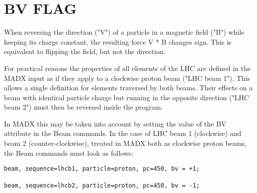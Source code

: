 
\section{BV FLAG}

When reversing the direction ("V") of a particle in a magnetic field
("B") while keeping its charge constant, the resulting force V * B
changes sign. This is equivalent to flipping the field, but not the
direction.  

For practical reasons the properties of all elements of the LHC are
defined in the MADX input as if they apply to a clockwise proton beam
("LHC beam 1"). This allows a single definition for elements traversed
by both beams. Their effects on a beam with identical particle charge
but running in the opposite direction ("LHC beam 2") must then be
reversed inside the program.  

In MADX this may be taken into account by setting the value of the BV
attribute in the Beam commands. In the case of LHC beam 1 (clockwise)
and beam 2 (counter-clockwise), treated in MADX both as clockwise proton
beams, the Beam commands must look as follows: 

\begin{verbatim}
beam, sequence=lhcb1, particle=proton, pc=450, bv = +1;

beam, sequence=lhcb2, particle=proton, pc=450, bv = -1;
\end{verbatim}

